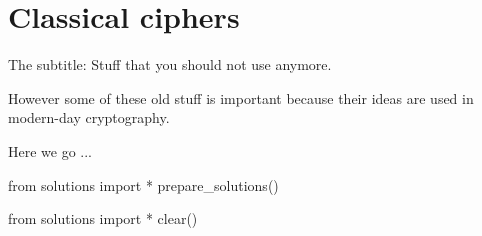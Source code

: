\chapter{Classical ciphers}


\newpage
The subtitle: Stuff that you should not use anymore.

However some of these old stuff is important because
their ideas are used in modern-day cryptography.

Here we go ... 

\newpage
\newpage
\newpage
\newpage
\newpage
\newpage
\newpage
\newpage
\newpage
\newpage
\newpage
\newpage

\begin{python0}
from solutions import *
prepare_solutions()
\end{python0}

\begin{python0}
from solutions import *
clear()
\end{python0}
